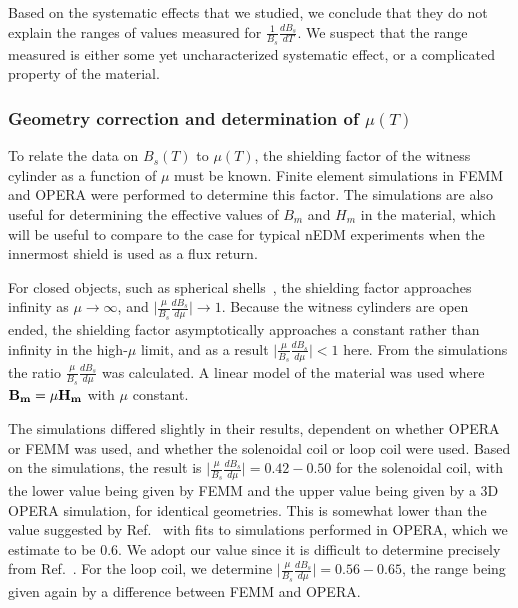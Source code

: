 Based on the systematic effects that we studied, we conclude that they
do not explain the ranges of values measured for
$\frac{1}{B_s}\frac{dB_s}{dT}$.  We suspect that the range measured is
either some yet uncharacterized systematic effect, or a complicated
property of the material.


\subsubsection{Geometry correction and determination of $\mu(T)$\label{sec:axialsims}}

To relate the data on $B_s(T)$ to $\mu(T)$, the shielding factor of
the witness cylinder as a function of $\mu$ must be known.  Finite
element simulations in FEMM and OPERA were performed to determine this
factor.  The simulations are also useful for determining the effective
values of $B_m$ and $H_m$ in the material, which will be useful to
compare to the case for typical nEDM experiments when the innermost
shield is used as a flux return.

For closed objects, such as spherical
shells~\cite{bib:bidinostimartin,bib:urankar}, the shielding factor
approaches infinity as $\mu \rightarrow \infty$, and
$\vert\frac{\mu}{B_s}\frac{dB_s}{d\mu}\vert\rightarrow 1$.  Because
the witness cylinders are open ended, the shielding factor
asymptotically approaches a constant rather than infinity in the
high-$\mu$ limit, and as a result
$\vert\frac{\mu}{B_s}\frac{dB_s}{d\mu}\vert<1$ here.  From the
simulations the ratio $\frac{\mu}{B_s}\frac{dB_s}{d\mu}$ was
calculated.  A linear model of the material was used where
$\bold{B_m}=\mu\bold{H_m}$ with $\mu$ constant.


The simulations differed slightly in their results, dependent on
whether OPERA or FEMM was used, and whether the solenoidal coil or
loop coil were used.  Based on the simulations, the result is
$\vert\frac{\mu}{B_s}\frac{dB_s}{d\mu}\vert=0.42-0.50$ for the
solenoidal coil, with the lower value being given by FEMM and the
upper value being given by a 3D OPERA simulation, for identical
geometries.  This is somewhat lower than the value suggested by
Ref.~\cite{bib:paperno-open-ended} with fits to simulations performed
in OPERA, which we estimate to be 0.6.  We adopt our value since it is
difficult to determine precisely from
Ref.~\cite{bib:paperno-open-ended}.  For the loop coil, we determine
$\vert\frac{\mu}{B_s}\frac{dB_s}{d\mu}\vert=0.56-0.65$, the range
being given again by a difference between FEMM and OPERA.

